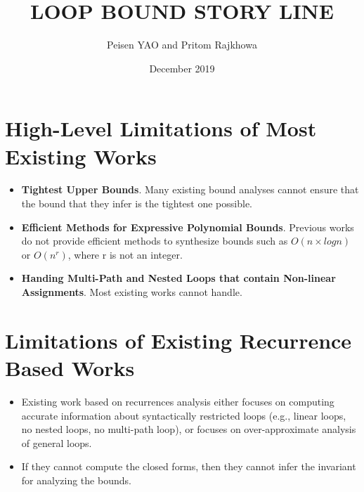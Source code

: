 \documentclass{article}
\title{LOOP BOUND STORY LINE}
\author{Peisen YAO and Pritom Rajkhowa }
\date{December 2019}
\begin{document}
\maketitle

\section{High-Level Limitations of Most Existing Works}
\begin{itemize}
    \item \textbf{Tightest Upper Bounds}.  Many existing bound analyses cannot ensure that the bound that they infer is the tightest one possible.
    \item \textbf{Efficient Methods for Expressive Polynomial Bounds}. Previous works do not provide efficient methods to synthesize bounds such as $O(n \times log n)$ or $O(n^r)$, where r is not an integer.
    
    \item \textbf{Handing Multi-Path and Nested Loops that contain Non-linear Assignments}. Most existing works cannot handle.
\end{itemize}
    





\section{Limitations of Existing Recurrence Based Works}
\begin{itemize}
\item Existing work based on recurrences analysis either focuses on computing accurate information about syntactically restricted loops (e.g., linear loops, no nested loops, no multi-path loop), or focuses on over-approximate analysis of general loops.  
\item If they cannot compute the closed forms, then they cannot infer the invariant for analyzing the bounds.
\end{itemize}
\end{document}
